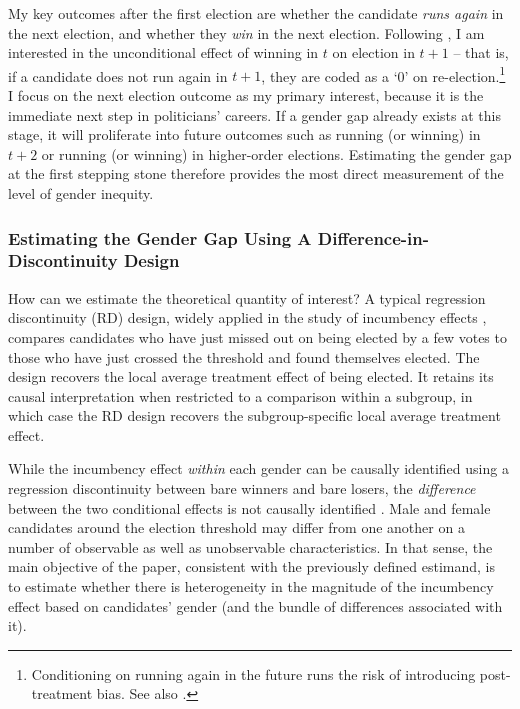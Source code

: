 \documentclass[12pt]{article}
\begin{document}
My key outcomes after the first election are whether the candidate \emph{runs again} in the next election, and whether they \emph{win} in the next election. Following \citet{demagalhaes2015}, I am interested in the unconditional effect of winning in $t$ on election in $t+1$ -- that is, if a candidate does not run again in $t + 1$, they are coded as a `0' on re-election.\footnote{Conditioning on running again in the future runs the risk of introducing post-treatment bias. See also \citet{hyytinen2018a,cirone2020}.} I focus on the next election outcome as my primary interest, because it is the immediate next step in politicians' careers. If a gender gap already exists at this stage, it will proliferate into future outcomes such as running (or winning) in $t + 2$ or running (or winning) in higher-order elections. Estimating the gender gap at the first stepping stone therefore provides the most direct measurement of the level of gender inequity.

\subsubsection{Estimating the Gender Gap Using A Difference-in-Discontinuity Design}

How can we estimate the theoretical quantity of interest? A typical regression discontinuity (RD) design, widely applied in the study of incumbency effects \citep[e.g.][]{lee2001a,demagalhaes2015,folke2016d}, compares candidates who have just missed out on being elected by a few votes to those who have just crossed the threshold and found themselves elected. The design recovers the local average treatment effect of being elected. It retains its causal interpretation when restricted to a comparison within a subgroup, in which case the RD design recovers the subgroup-specific local average treatment effect.

While the incumbency effect \emph{within} each gender can be causally identified using a regression discontinuity between bare winners and bare losers, the \emph{difference} between the two conditional effects is not causally identified \citep{wasserman2020,brown2019}. Male and female candidates around the election threshold may differ from one another on a number of observable as well as unobservable characteristics. In that sense, the main objective of the paper, consistent with the previously defined estimand, is to estimate whether there is heterogeneity in the magnitude of the incumbency effect based on candidates' gender (and the bundle of differences associated with it).
\end{document}
